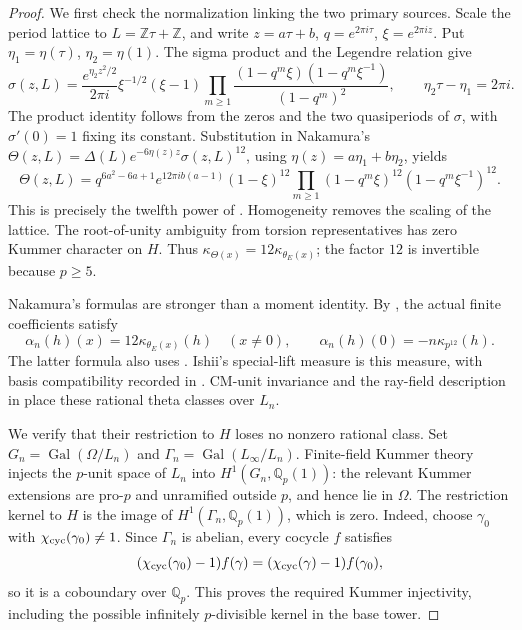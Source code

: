 \documentclass[11pt]{article}
\theoremstyle{definition}\newtheorem{definition}[theorem]{Definition}
\begin{document}
\begin{proof}
We first check the normalization linking the two primary
sources.  Scale the period lattice to
\(L=\mathbb Z\tau+\mathbb Z\), and write
\(z=a\tau+b\), \(q=e^{2\pi i\tau}\),
\(\xi=e^{2\pi iz}\).  Put
\(\eta_1=\eta(\tau)\), \(\eta_2=\eta(1)\).
The sigma product and the Legendre relation give
\[
 \sigma(z,L)=\frac{e^{\eta_2z^2/2}}{2\pi i}
       \xi^{-1/2}(\xi-1)
       \prod_{m\ge1}
       \frac{(1-q^m\xi)(1-q^m\xi^{-1})}{(1-q^m)^2},
 \qquad \eta_2\tau-\eta_1=2\pi i.
\]
The product identity follows from the zeros and the two
quasiperiods of \(\sigma\), with \(\sigma'(0)=1\)
fixing its constant.  Substitution in Nakamura's
\(\Theta(z,L)=\Delta(L)e^{-6\eta(z)z}\sigma(z,L)^{12}\),
using \(\eta(z)=a\eta_1+b\eta_2\), yields
\[
 \Theta(z,L)=q^{6a^2-6a+1}e^{12\pi ib(a-1)}
    (1-\xi)^{12}
    \prod_{m\ge1}(1-q^m\xi)^{12}(1-q^m\xi^{-1})^{12}.
\]
This is precisely the twelfth power of
\cite[equation (19), p.~7]{GoncharovEuler}.
Homogeneity removes the scaling of the lattice.
The root-of-unity ambiguity from torsion representatives
has zero Kummer character on \(H\).  Thus
\(\kappa_{\Theta(x)}=12\kappa_{\theta_E(x)}\);
the factor \(12\) is invertible because \(p\ge5\).

Nakamura's formulas are stronger than a moment identity.
By \cite[equation (3.5.1), p.~209, and
equations (4.11.3)--(4.11.5), p.~220]{Nakamura1995},
the actual finite coefficients satisfy
\begin{equation}\label{eq:cm-alpha-theta-finite}
 \alpha_n(h)(x)=12\kappa_{\theta_E(x)}(h)\quad(x\ne0),
 \qquad
 \alpha_n(h)(0)=-n\kappa_{p^{12}}(h).
\end{equation}
The latter formula also uses
\cite[Proposition (3.8), p.~210]{Nakamura1995}.
Ishii's special-lift measure is this measure, with basis
compatibility recorded in
\cite[Remark 2.6.1(2), p.~8]{Ishii}.
CM-unit invariance and the ray-field description in
\cite[p.~27]{GoncharovEuler} place these rational theta
classes over \(L_n\).

We verify that their restriction to \(H\) loses no
nonzero rational class.  Set
\(G_n=\operatorname{Gal}(\Omega/L_n)\) and
\(\Gamma_n=\operatorname{Gal}(L_\infty/L_n)\).
Finite-field Kummer theory injects the \(p\)-unit
space of \(L_n\) into \(H^1(G_n,\mathbb Q_p(1))\):
the relevant Kummer extensions are pro-\(p\) and
unramified outside \(p\), and hence lie in \(\Omega\).
The restriction kernel to \(H\) is the image of
\(H^1(\Gamma_n,\mathbb Q_p(1))\), which is zero.
Indeed, choose \(\gamma_0\) with
\(\chi_{\rm cyc}(\gamma_0)\ne1\).  Since \(\Gamma_n\)
is abelian, every cocycle \(f\) satisfies
\[
 (\chi_{\rm cyc}(\gamma_0)-1)f(\gamma)
       =(\chi_{\rm cyc}(\gamma)-1)f(\gamma_0),
\]
so it is a coboundary over \(\mathbb Q_p\).
This proves the required Kummer injectivity, including
the possible infinitely \(p\)-divisible kernel in the
base tower.


\end{proof}
\end{document}
